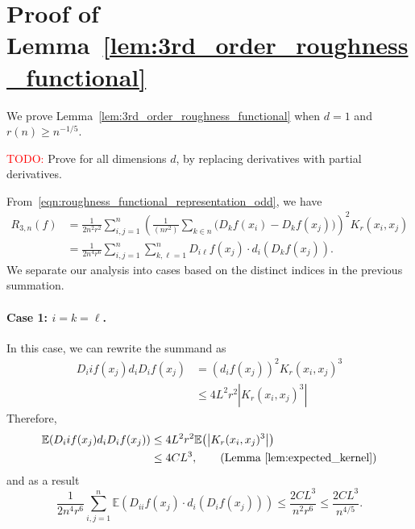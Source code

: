 \documentclass{article}
\newcommand{\abs}[1]{\left \lvert #1 \right \rvert}
\newcommand{\1}{\mathbf{1}}
\newcommand{\Ebb}{\mathbb{E}}
\theoremstyle{alden}
\theoremstyle{aldenthm}
\theoremstyle{definition}
\theoremstyle{remark}
\begin{document}
\section{Proof of Lemma~\ref{lem:3rd_order_roughness_functional}}
We prove Lemma~\ref{lem:3rd_order_roughness_functional} when $d = 1$ and $r(n) \geq n^{-1/5}$.

\textcolor{red}{TODO:} Prove for all dimensions $d$, by replacing derivatives with partial derivatives.

From~\eqref{eqn:roughness_functional_representation_odd}, we have
\begin{align*}
R_{3,n}(f) & = \frac{1}{2n^2r^2}\sum_{i,j = 1}^{n}\left(\frac{1}{(nr^2)}\sum_{k \in n}\bigl(D_kf(x_i) - D_kf(x_j)\bigr)\right)^2K_r(x_i,x_j) \\
& = \frac{1}{2n^4r^6}\sum_{i,j = 1}^{n} \sum_{k,\ell = 1}^{n} D_{i\ell}f(x_j) \cdot d_i(D_kf(x_j)).
\end{align*}
We separate our analysis into cases based on the distinct indices in the previous summation.

\paragraph{Case 1: $i = k = \ell$.}
In this case, we can rewrite the summand as
\begin{align*}
D_iif(x_j) d_iD_if(x_j) & = (d_if(x_j))^2 K_r(x_i,x_j)^3 \\
& \leq 4L^2r^2 \abs{K_r(x_i,x_j)^3}
\end{align*}
Therefore,
\begin{align*}
\Ebb(D_iif(x_j) d_iD_if(x_j)) & \leq 4L^2 r^2 \Ebb\bigl(\abs{K_r(x_i,x_j)^3}\bigr)\\
& \leq 4CL^3, \tag{Lemma~\ref{lem:expected_kernel}}
\end{align*}
and as a result
\begin{equation*}
\frac{1}{2n^4r^6}\sum_{i,j = 1}^{n} \Ebb(D_{ii}f(x_j) \cdot d_i(D_if(x_j))) \leq \frac{2CL^3}{n^2r^6} \leq \frac{2CL^3}{n^{4/5}}.
\end{equation*}
\end{document}
